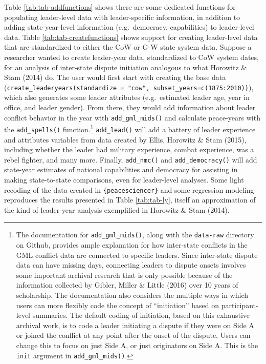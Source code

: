 \documentclass[
  11pt,
]{article}
\begin{document}
Table \ref{tab:tab-addfunctions} shows there are some dedicated functions for populating leader-level data with leader-specific information, in addition to adding state-year-level information (e.g.~democracy, capabilities) to leader-level data. Table \ref{tab:tab-createfunctions} shows support for creating leader-level data that are standardized to either the CoW or G-W state system data. Suppose a researcher wanted to create leader-year data, standardized to CoW system dates, for an analysis of inter-state dispute initiation analogous to what Horowitz \& Stam (2014) do. The user would first start with creating the base data (\texttt{create\_leaderyears(standardize\ =\ "cow",\ subset\_years=c(1875:2010))}), which also generates some leader attributes (e.g.~estimated leader age, year in office, and leader gender). From there, they would add information about leader conflict behavior in the year with \texttt{add\_gml\_mids()} and calculate peace-years with the \texttt{add\_spells()} function.\footnote{The documentation for \texttt{add\_gml\_mids()}, along with the \texttt{data-raw} directory on Github, provides ample explanation for how inter-state conflicts in the GML conflict data are connected to specific leaders. Since inter-state dispute data can have missing days, connecting leaders to dispute onsets involves some important archival research that is only possible because of the information collected by Gibler, Miller \& Little (2016) over 10 years of scholarship. The documentation also considers the multiple ways in which users can more flexibly code the concept of ``initiation'' based on participant-level summaries. The default coding of initiation, based on this exhaustive archival work, is to code a leader initiating a dispute if they were on Side A or joined the conflict at any point after the onset of the dispute. Users can change this to focus on just Side A, or just originators on Side A. This is the \texttt{init} argument in \texttt{add\_gml\_mids()}.} \texttt{add\_lead()} will add a battery of leader experience and attributes variables from data created by Ellis, Horowitz \& Stam (2015), including whether the leader had military experience, combat experience, was a rebel fighter, and many more. Finally, \texttt{add\_nmc()} and \texttt{add\_democracy()} will add state-year estimates of national capabilities and democracy for assisting in making state-to-state comparisons, even for leader-level analyses. Some light recoding of the data created in \texttt{\{peacesciencer\}} and some regression modeling reproduces the results presented in Table \ref{tab:tab-ly}, itself an approximation of the kind of leader-year analysis exemplified in Horowitz \& Stam (2014).
\end{document}
